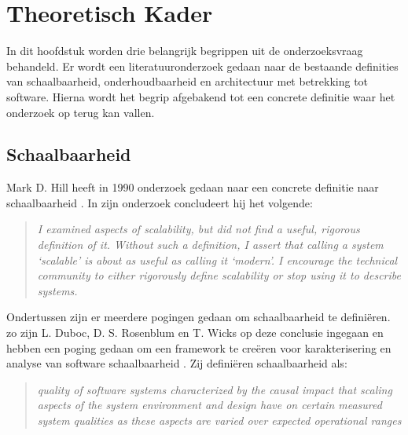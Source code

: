 \chapter{Theoretisch Kader}
\label{Chapter2}

In dit hoofdstuk worden drie belangrijk begrippen uit de onderzoeksvraag behandeld. Er wordt een literatuuronderzoek gedaan naar de bestaande definities van schaalbaarheid, onderhoudbaarheid en architectuur met betrekking tot software. Hierna wordt het begrip afgebakend tot een concrete definitie waar het onderzoek op terug kan vallen.

\section{Schaalbaarheid}

Mark D. Hill heeft in 1990 onderzoek gedaan naar een concrete definitie naar schaalbaarheid \parencite{WhatIsScalability}. In zijn onderzoek concludeert hij het volgende:
\begin{quote}
	\textit{
		I examined aspects of scalability, but did not find a useful, rigorous definition of it. Without such a definition, I assert that calling a system ‘scalable’ is about as useful as calling it ‘modern’. I encourage the technical community to either rigorously define scalability or stop using it to describe systems.
	}
\end{quote}
Ondertussen zijn er meerdere pogingen gedaan om schaalbaarheid te definiëren. zo zijn L. Duboc, D. S. Rosenblum en T. Wicks op deze conclusie ingegaan en hebben een poging gedaan om een framework te creëren voor karakterisering en analyse van software schaalbaarheid \parencite{ScalabilityFramework}. Zij definiëren schaalbaarheid als:
\begin{quote}
	\textit{quality of software systems characterized by the causal impact that scaling aspects of the system environment and design have on certain measured system qualities as these aspects are varied over expected operational ranges}
\end{quote}



